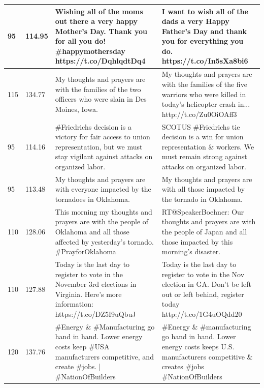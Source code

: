 \documentclass[11pt]{article}
\begin{document}
\begin{flushleft}
\begin{table}[]
\begin{tabular}{|p{}|p{}|p{}|p{}|}
95       & 114.95    & Wishing all of the moms out there a very happy Mother's Day. Thank you for all you do! \#happymothersday https://t.co/DqhlqdtDq4                         & I want to wish all of the dads a very Happy Father’s Day and thank you for everything you do. https://t.co/In5sXa8bi6                                     \\ \hline
115      & 134.77    & My thoughts and prayers are with the families of the two officers who were slain in Des Moines, Iowa.                                                    & My thoughts and prayers are with the families of the five warriors who were killed in today's helicopter crash in... http://t.co/Zu0OiOAff3               \\ \hline
95       & 114.16    & \#Friedrichs decision is a victory for fair access to union representation, but we must stay vigilant against attacks on organized labor.                & SCOTUS \#Friedrichs tie decision is a win for union representation \& workers. We must remain strong against attacks on organized labor.              \\ \hline
95       & 113.48    & My thoughts and prayers are with everyone impacted by the tornadoes in Oklahoma.                                                                         & My thoughts and prayers are with all those impacted by the tornado in Oklahoma.                                                                           \\ \hline
110      & 128.06    & This morning my thoughts and prayers are with the people of Oklahoma and all those affected by yesterday's tornado. \#PrayforOklahoma                    & RT@SpeakerBoehner: Our thoughts and prayers are with the people of Japan and all those impacted by this morning’s disaster.                               \\ \hline
110      & 127.88    & Today is the last day to register to vote in the November 3rd elections in Virginia. Here's more information: https://t.co/DZ5I9uQbuJ                    & Today is the last day to register to vote in the Nov election in GA. Don't be left out or left behind, register today http://t.co/1G4uOQdd20              \\ \hline
120      & 137.76    & \#Energy \& \#Manufacturing go hand in hand. Lower energy costs keep \#USA manufacturers competitive, and create \#jobs. | \#NationOfBuilders        & \#Energy \& \#manufacturing go hand in hand. Lower energy costs keeps U.S. manufacturers competitive \& creates \#jobs \#NationOfBuilders         \\ \hline

\end{tabular}
\end{table}
\end{flushleft}
\end{document}
